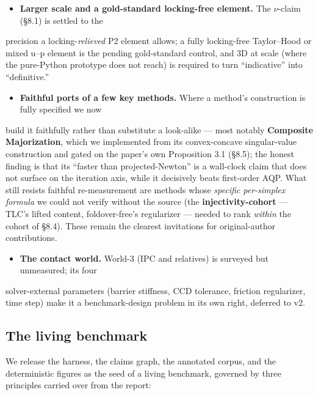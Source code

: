 \documentclass{egpubl}
\begin{document}
\begin{itemize}
  \item \textbf{Larger scale and a gold-standard locking-free element.} The \texttt{$\nu$}-claim (\S8.1) is settled to the
\end{itemize}
  precision a locking-\emph{relieved} P2 element allows; a fully locking-free Taylor--Hood or mixed u--p
  element is the pending gold-standard control, and 3D at scale (where the pure-Python prototype does
  not reach) is required to turn ``indicative'' into ``definitive.''
\begin{itemize}
  \item \textbf{Faithful ports of a few key methods.} Where a method's construction is fully specified we now
\end{itemize}
  build it faithfully rather than substitute a look-alike --- most notably \textbf{Composite Majorization},
  which we implemented from its convex-concave singular-value construction and gated on the paper's own
  Proposition 3.1 (\S8.5); the honest finding is that its ``faster than projected-Newton'' is a wall-clock
  claim that does not surface on the iteration axis, while it decisively beats first-order AQP. What
  still resists faithful re-measurement are methods whose \emph{specific per-simplex formula} we could not
  verify without the source (the \textbf{injectivity-cohort} --- TLC's lifted content, foldover-free's
  regularizer --- needed to rank \emph{within} the cohort of \S8.4). These remain the clearest invitations for
  original-author contributions.
\begin{itemize}
  \item \textbf{The contact world.} World-3 (IPC and relatives) is surveyed but unmeasured; its four
\end{itemize}
  solver-external parameters (barrier stiffness, CCD tolerance, friction regularizer, time step) make
  it a benchmark-design problem in its own right, deferred to v2.

\subsection{The living benchmark}

We release the harness, the claims graph, the annotated corpus, and the deterministic figures as the
seed of a living benchmark, governed by three principles carried over from the report:
\end{document}
